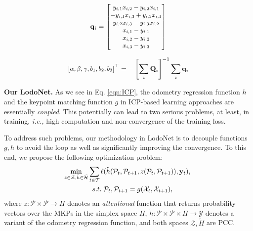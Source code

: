 \documentclass[sigconf]{acmart}
\def\ie{\emph{i.e., }}
\def\lodo{LodoNet}
\newcommand{\bfsection}[1]{\vspace*{0.1cm}\noindent\textbf{#1.}}
\begin{document}
\begin{align}
\small
    \mathbf{q}_i = 
    \begin{bmatrix}
        y_{i,1}x_{i,2} - y_{i,2}x_{i,1} \\
        -y_{i,1}x_{i,3} + y_{i,3}x_{i,1} \\
        y_{i,2}x_{i,3} - y_{i,3}x_{i,2} \\
        x_{i,1} - y_{i,1} \\
        x_{i,2} - y_{i,2} \\
        x_{i,3} - y_{i,3}
    \end{bmatrix}
\end{align}

\begin{align}
\small
    \begin{bmatrix}
        \alpha,
        \beta,
        \gamma,
        b_1,
        b_2,
        b_3
    \end{bmatrix}^\top=-\left[\sum_i\mathbf{Q}_i\right]^{-1}\sum_i\mathbf{q}_i
\end{align}


\bfsection{Our \lodo{}}
As we see in Eq. \ref{eqn:ICP}, the odometry regression function $h$ and the keypoint matching function $g$ in ICP-based learning approaches are essentially {\em coupled}. This potentially can lead to two serious problems, at least, in training, \ie high computation and non-convergence of the training loss.

To address such problems, our methodology in \lodo{} is to decouple functions $g, h$ to avoid the loop as well as significantly improving the convergence. To this end, we propose the following optimization problem:
\begin{align}\label{eqn:lodonet}
\small
    \min_{z\in\mathcal{Z},  \Tilde{h}\in\tilde{\mathcal{H}}}  \sum_{t\in\mathcal{T}}\ell & (\tilde{h}(\mathcal{P}_{t},  \mathcal{P}_{t+1}, z(\mathcal{P}_{t}, \mathcal{P}_{t+1})), \mathbf{y}_{t}), \; \notag \\
    s.t. \;& \mathcal{P}_{t}, \mathcal{P}_{t+1} = g(\mathcal{X}_{t}, \mathcal{X}_{t+1}), 
\end{align}
where $z:\mathcal{P}\times\mathcal{P}\rightarrow\Pi$ denotes an {\em attentional} function that returns probability vectors over the MKPs in the simplex space $\Pi$, $\tilde{h}:\mathcal{P}\times\mathcal{P}\times\Pi\rightarrow\mathcal{Y}$ denotes a variant of the odometry regression function, and both spaces $\mathcal{Z}, \tilde{H}$ are PCC.
\end{document}

